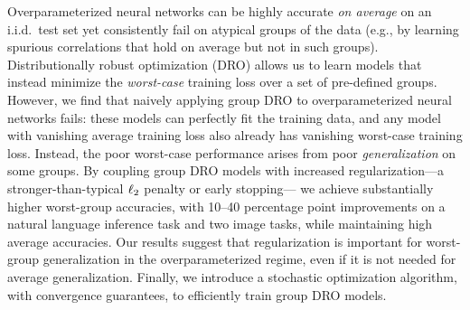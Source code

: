 Overparameterized neural networks
can be highly accurate \emph{on average} on an i.i.d.\ test set
yet consistently fail on atypical groups of the data
(e.g., by learning spurious correlations that hold on average but not in such groups).
Distributionally robust optimization (DRO) allows us to learn models that instead
minimize the \emph{worst-case} training loss over a set of pre-defined groups.
However, we find that naively applying group DRO to overparameterized neural networks fails:
these models can perfectly fit the training data,
and any model with vanishing average training loss
also already has vanishing worst-case training loss.
Instead, the poor worst-case performance arises from poor \emph{generalization} on some groups.
By coupling group DRO models with increased regularization---a stronger-than-typical $\ell_2$ penalty or early stopping---%
we achieve substantially higher worst-group accuracies,
with 10--40 percentage point improvements
on a natural language inference task and two image tasks, while maintaining high average accuracies.
Our results suggest that regularization is important for worst-group generalization in the overparameterized regime, even if it is not needed for average generalization.
Finally, we introduce a stochastic optimization algorithm, with convergence guarantees, to efficiently train group DRO models.
